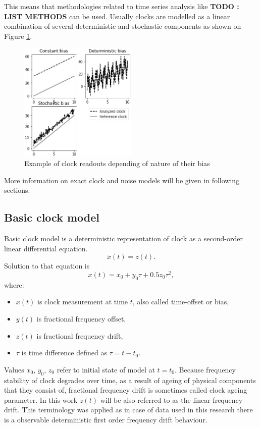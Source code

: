 This means that methodologies related to time series analysis like \textbf{TODO : LIST METHODS}
can be used.
Usually clocks are modelled as a linear combination of several deterministic and stochastic 
components as shown on Figure \ref{fig:clocks_example}. 
\begin{figure}[htb] 
\label{fig:clocks_example}
\centering
\includegraphics[width=0.5\textwidth]{figures/bias_examples}
\caption{Example of clock readouts depending of nature of their bias}
\end{figure}
More information on exact clock and noise models will be given in following sections.

\subsection{Basic clock model}
Basic clock model is a deterministic representation of clock as a second-order linear differential
equation.
\begin{equation}
	\label{equ:basic_clock}
	\ddot{x}(t)=z(t).
\end{equation}
Solution to that equation is
\begin{equation}
	\label{equ:basic_clock_solved}
	x(t)=x_{0}+y_{0}\tau+0.5z_{0}\tau^{2},
\end{equation}
where:
\begin{itemize}
	\item $x(t)$ is clock measurement at time $t$, also called time-offset or bias,
	\item $y(t)$ is fractional frequency offset,
	\item $z(t)$ is fractional frequency drift,
	\item $\tau$ is time difference defined as $\tau = t-t_{0}$.
\end{itemize}
Values $x_{0}$, $y_{0}$, $z_{0}$ refer to initial state of model at $t=t_{0}$.
Because frequency stability of clock degrades over time, as a result of ageing of physical 
components that they consist of, fractional frequency drift is sometimes called clock 
ageing parameter.
In this work $z(t)$ will be also referred to as the linear frequency drift. This terminology
was applied as in case of data used in this research there is a observable deterministic 
first order frequency drift behaviour.

